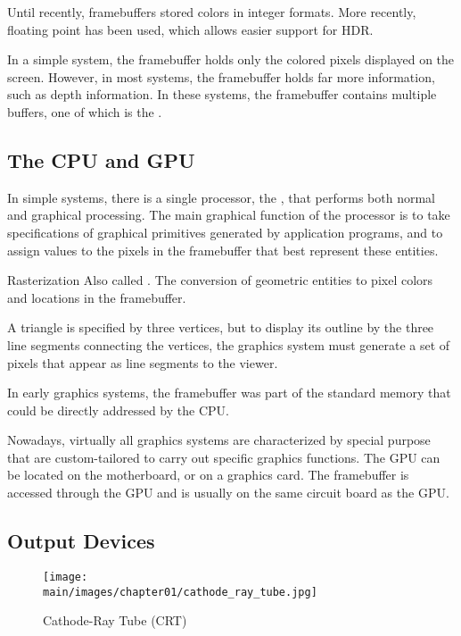 \documentclass[\main/notes.tex]{subfiles}
\begin{document}
				Until recently, framebuffers stored colors in integer formats.
				More recently, floating point has been used, which allows easier support for HDR.

				In a simple system, the framebuffer holds only the colored pixels displayed on the screen.
				However, in most systems, the framebuffer holds far more information, such as depth
				information.
				In these systems, the framebuffer contains multiple buffers, one of which is the
				.

			\subsection{The CPU and GPU}
				In simple systems, there is a single processor, the ,
				that performs both normal and graphical processing.
				The main graphical function of the processor is to take specifications of graphical
				primitives generated by application programs,
				and to assign values to the pixels in the framebuffer that best represent these entities.

				\begin{definition}{Rasterization}
					Also called .
					The conversion of geometric entities to pixel colors and locations in the framebuffer.

					\begin{example}
						A triangle is specified by three vertices,
						but to display its outline by the three line segments connecting the vertices,
						the graphics system must generate a set of pixels that appear as line segments to the
						viewer.
					\end{example}
				\end{definition}

				In early graphics systems, the framebuffer was part of the standard memory
				that could be directly addressed by the CPU.

				Nowadays, virtually all graphics systems are characterized by special purpose
				 that are custom-tailored
				to carry out specific graphics functions.
				The GPU can be located on the motherboard, or on a graphics card.
				The framebuffer is accessed through the GPU and is usually on the same circuit board
				as the GPU.
			\pagebreak

			\subsection{Output Devices}
				\begin{wrapfigure}{r}{0.5\textwidth}
					\begin{center}
						\texttt{[image: \\main/images/chapter01/cathode\_ray\_tube.jpg]}
					\end{center}
					\caption{Cathode-Ray Tube (CRT)}
				\end{wrapfigure}
\end{document}
